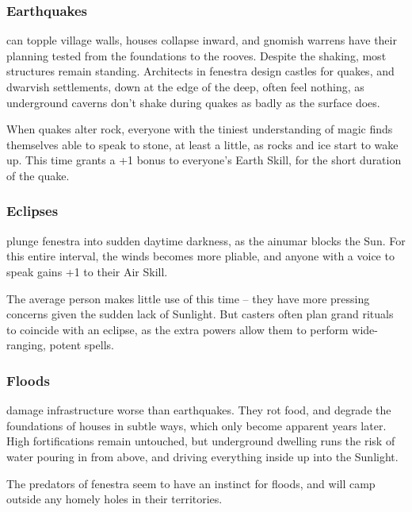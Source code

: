 \begin{multicols}{2}
\subsubsection{Earthquakes}
can topple \gls{village} walls, houses collapse inward, and gnomish warrens have their planning tested from the foundations to the rooves.
Despite the shaking, most structures remain standing.
Architects in \gls{fenestra} design castles for quakes, and dwarvish settlements, down at the edge of the \gls{deep}, often feel nothing, as underground caverns don't shake during quakes as badly as the surface does.

When quakes alter rock, everyone with the tiniest understanding of magic finds themselves able to speak to stone, at least a little, as rocks and ice start to wake up.
This time grants a +1 bonus to everyone's Earth Skill, for the short duration of the quake.

\subsubsection{Eclipses}
plunge \gls{fenestra} into sudden daytime darkness, as the \gls{ainumar} blocks the Sun.
For this entire \gls{interval}, the winds becomes more pliable, and anyone with a voice to speak gains +1 to their Air Skill.

The average person makes little use of this time -- they have more pressing concerns given the sudden lack of Sunlight.
But casters often plan grand rituals to coincide with an eclipse, as the extra powers allow them to perform wide-ranging, potent spells.

\subsubsection{Floods}
damage infrastructure worse than earthquakes.
They rot food, and degrade the foundations of houses in subtle ways, which only become apparent years later.
High fortifications remain untouched, but underground dwelling runs the risk of water pouring in from above, and driving everything inside up into the Sunlight.

The predators of \gls{fenestra} seem to have an instinct for floods, and will camp outside any homely holes in their territories.


\end{multicols}
